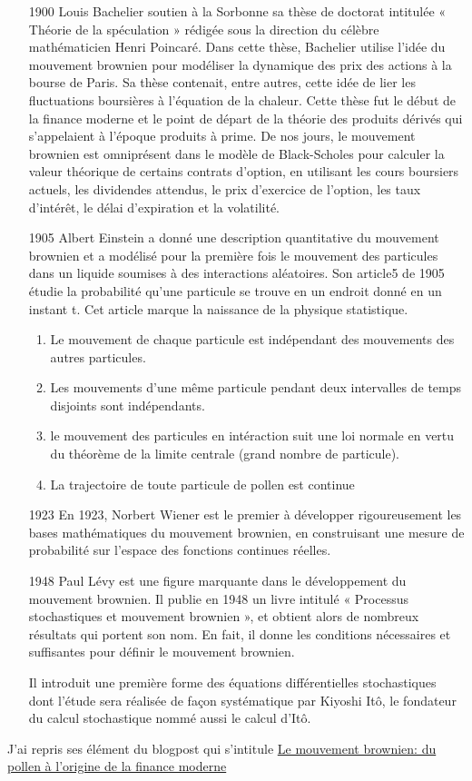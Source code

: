 \begin{itemize}
  \item[1900] Louis Bachelier soutien à la Sorbonne sa thèse de doctorat intitulée « Théorie de la spéculation » rédigée sous la direction du célèbre mathématicien Henri Poincaré. Dans cette thèse, Bachelier utilise l’idée du mouvement brownien pour modéliser la dynamique des prix des actions à la bourse de Paris. Sa thèse contenait, entre autres, cette idée de lier les fluctuations boursières à l’équation de la chaleur. Cette thèse fut le début de la finance moderne et le point de départ de la théorie des produits dérivés qui s’appelaient à l’époque produits à prime. De nos jours, le mouvement brownien est omniprésent dans le modèle de Black-Scholes pour calculer la valeur théorique de certains contrats d’option, en utilisant les cours boursiers actuels, les dividendes attendus, le prix d’exercice de l’option, les taux d’intérêt, le délai d’expiration et la volatilité.
  \item[1905] Albert Einstein a donné une description quantitative du mouvement brownien et a modélisé pour la première fois le mouvement des particules dans un liquide soumises à des interactions aléatoires. Son article5 de 1905 étudie la probabilité qu’une particule se trouve en un endroit donné en un instant t. Cet article marque la naissance de la physique statistique.
  \begin{enumerate}
    \item Le mouvement de chaque particule est indépendant des mouvements des autres particules.
    \item Les mouvements d’une même particule pendant deux intervalles de temps disjoints sont indépendants.
    \item le mouvement des particules en intéraction suit une loi normale en vertu du théorème de la limite centrale (grand nombre de particule).
    \item La trajectoire de toute particule de pollen est continue
  \end{enumerate}

\item[1923] En 1923, Norbert Wiener est le premier à développer rigoureusement les bases mathématiques du mouvement brownien, en construisant une mesure de probabilité sur l’espace des fonctions continues réelles.
\item[1948] Paul Lévy est une figure marquante dans le développement du mouvement brownien. Il publie en 1948 un livre intitulé « Processus stochastiques et mouvement brownien », et obtient alors de nombreux résultats qui portent son nom. En fait, il donne les conditions nécessaires et suffisantes pour définir le mouvement brownien.

Il introduit une première forme des équations différentielles stochastiques dont l’étude sera réalisée de façon systématique par Kiyoshi Itô, le fondateur du calcul stochastique nommé aussi le calcul d’Itô.
\end{itemize}
J'ai repris ses élément du blogpost qui s'intitule \href{https://accromath.uqam.ca/2023/01/le-mouvement-brownien-du-pollen-de-brown-a-lorigine-de-la-finance-moderne/}{Le mouvement brownien: du pollen à l'origine de la finance moderne}
